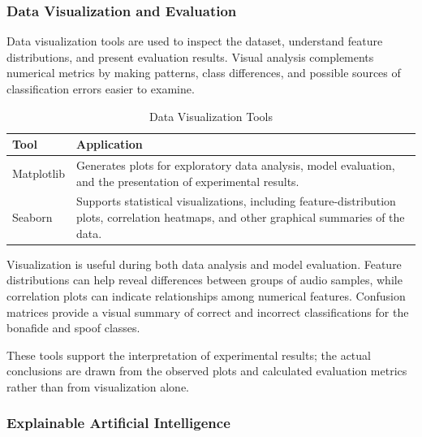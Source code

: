 \documentclass[12pt,a4paper]{report}
\begin{document}
\subsubsection{Data Visualization and Evaluation}

Data visualization tools are used to inspect the dataset, understand feature distributions, and present evaluation results. Visual analysis complements numerical metrics by making patterns, class differences, and possible sources of classification errors easier to examine.

\begin{table}[H]
\centering
\small
\renewcommand{\arraystretch}{1.35}

\begin{tabularx}{\textwidth}{
    >{\raggedright\arraybackslash}p{}
    >{\raggedright\arraybackslash}X
}
\toprule
\textbf{Tool} & \textbf{Application} \\
\midrule

Matplotlib &
Generates plots for exploratory data analysis, model evaluation, and the presentation of experimental results. \\

Seaborn &
Supports statistical visualizations, including feature-distribution plots, correlation heatmaps, and other graphical summaries of the data. \\

\bottomrule
\end{tabularx}

\caption{Data Visualization Tools}
\label{tab:visualization-tools}
\end{table}

Visualization is useful during both data analysis and model evaluation. Feature distributions can help reveal differences between groups of audio samples, while correlation plots can indicate relationships among numerical features. Confusion matrices provide a visual summary of correct and incorrect classifications for the bonafide and spoof classes.

These tools support the interpretation of experimental results; the actual conclusions are drawn from the observed plots and calculated evaluation metrics rather than from visualization alone.


\subsubsection{Explainable Artificial Intelligence}
\end{document}
